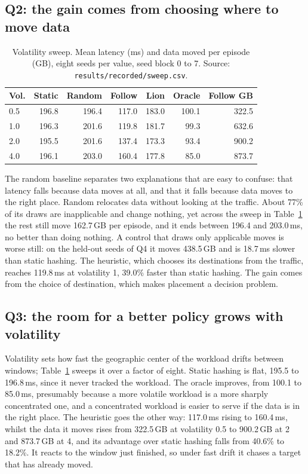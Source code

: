 \subsection{Q2: the gain comes from choosing where to move data}

\begin{table}[t]
\caption{Volatility sweep. Mean latency (ms) and data moved per episode
(GB), eight seeds per value, seed block 0 to 7. Source:
\texttt{results/recorded/sweep.csv}.}
\label{tab:sweep}
\centering
\small
\setlength{\tabcolsep}{4.5pt}
\begin{tabular}{lrrrrrr}
\toprule
Vol. & Static & Random & Follow & Lion & Oracle & Follow GB \\
\midrule
0.5 & 196.8 & 196.4 & 117.0 & 183.0 & 100.1 & 322.5 \\
1.0 & 196.3 & 201.6 & 119.8 & 181.7 &  99.3 & 632.6 \\
2.0 & 195.5 & 201.6 & 137.4 & 173.3 &  93.4 & 900.2 \\
4.0 & 196.1 & 203.0 & 160.4 & 177.8 &  85.0 & 873.7 \\
\bottomrule
\end{tabular}
\end{table}

The random baseline separates two explanations that are easy to confuse: that
latency falls because data moves at all, and that it falls because data moves
to the right place. Random relocates data without looking at the traffic.
About 77\% of its draws are inapplicable and change nothing, yet across the
sweep in Table~\ref{tab:sweep} the rest still move 162.7\,GB per episode, and it
ends between 196.4 and 203.0\,ms, no better than doing nothing. A control that
draws only applicable moves is worse still: on the held-out seeds of Q4 it
moves 438.5\,GB and is 18.7\,ms slower than static hashing. The heuristic,
which chooses its destinations from the traffic, reaches 119.8\,ms at
volatility 1, 39.0\% faster than static hashing. The gain comes from the choice
of destination, which makes placement a decision problem.

\subsection{Q3: the room for a better policy grows with volatility}

Volatility sets how fast the geographic center of the workload drifts between
windows; Table~\ref{tab:sweep} sweeps it over a factor of eight. Static hashing
is flat, 195.5 to 196.8\,ms, since it never tracked the workload. The oracle
improves, from 100.1 to 85.0\,ms, presumably because a more volatile workload
is a more sharply concentrated one, and a concentrated workload is easier to
serve if the data is in the right place. The heuristic goes the other way:
117.0\,ms rising to 160.4\,ms, whilst the data it moves rises from 322.5\,GB at
volatility 0.5 to 900.2\,GB at 2 and 873.7\,GB at 4, and its advantage over
static hashing falls from 40.6\% to 18.2\%. It reacts to the window just
finished, so under fast drift it chases a target that has already moved.

